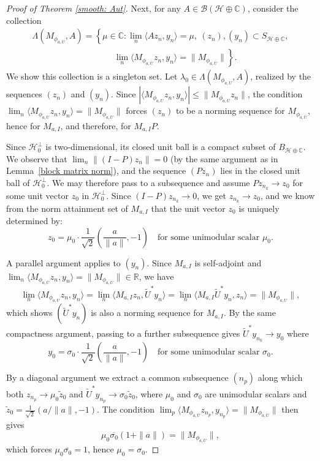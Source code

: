 \documentclass[12pt]{amsart}
\theoremstyle{definition}
\renewcommand{\H}{\mathcal{H}}
\begin{document}
\begin{proof}[Proof of Theorem \ref{smooth: Aut}]
\medskip

Next, for any $A \in \mathcal{B}(\mathcal{H} \oplus \mathbb{C})$, consider the 
collection 
\begin{multline*}
\Lambda(M_{\phi_{a,U}}, A) = \left\{\mu \in \mathbb{C} : 
\lim_n \langle Az_n, y_n\rangle = \mu,\ 
(z_n),(y_n) \subset S_{\mathcal{H}\oplus\mathbb{C}},\right.\\
\left.\hspace{4cm} \lim_n \langle M_{\phi_{a,U}}z_n, y_n\rangle 
= \|M_{\phi_{a,U}}\|\right\}.
\end{multline*}
We show this collection is a singleton set. Let $\lambda_0 \in 
\Lambda(M_{\phi_{a,U}}, A)$, realized by the sequences $(z_n)$ and $(y_n)$. 
Since $|\langle M_{\phi_{a,U}}z_n, y_n\rangle| \leq \|M_{\phi_{a,U}}z_n\|$, the 
condition $\lim_n\langle M_{\phi_{a,U}}z_n, y_n\rangle = \|M_{\phi_{a,U}}\|$ 
forces $(z_n)$ to be a norming sequence for $M_{\phi_{a,U}}$, hence for 
$M_{a,I}$, and therefore, for $M_{a,I}P$.

\medskip

\noindent Since $\mathcal{H}_0^\perp$ is 
two-dimensional, its closed unit ball is a compact subset of $B_{\H\oplus \mathbb{C}}$. We observe that 
$\lim_n\|(I-P)z_n\| = 0$ (by the same argument as in 
Lemma~\ref{block matrix norm}), and the sequence $(Pz_n)$ lies in the closed unit ball of $\mathcal{H}_0^\perp$. We may therefore pass to a 
subsequence and assume $Pz_{n_k} \to z_0$ for some unit vector $z_0$ in $\mathcal{H}_0^\perp$. Since $(I-P)z_{n_k} \to 0$, we get 
$z_{n_k} \to z_0$, and we know from the norm attainment set of $M_{a,I}$ that the unit vector $z_0$ is uniquely determined by:
\[
z_0 = \mu_0\cdot\frac{1}{\sqrt{2}}\left(\frac{a}{\|a\|}, -1\right)
\quad\text{for some unimodular scalar } \mu_0.
\]

\noindent A parallel argument applies to $(y_n)$. Since $M_{a,I}$ 
is self-adjoint and $\lim_n\langle M_{\phi_{a,U}}z_n, y_n\rangle = 
\|M_{\phi_{a,U}}\| \in \mathbb{R}$, we have
\[
\lim_n\langle M_{\phi_{a,U}}z_n, y_n\rangle 
= \lim_n\langle M_{a,I}z_n, \widetilde{U}^*y_n\rangle 
= \lim_n\langle M_{a,I}\widetilde{U}^*y_n, z_n\rangle 
= \|M_{\phi_{a,U}}\|,
\]
which shows $(\widetilde{U}^*y_n)$ is also a norming sequence for 
$M_{a,I}$. By the same compactness argument, passing to a further 
subsequence gives $\widetilde{U}^*y_{n_k} \to y_0$ where
\[
y_0 = \sigma_0\cdot\frac{1}{\sqrt{2}}\left(\frac{a}{\|a\|}, -1\right)
\quad\text{for some unimodular scalar } \sigma_0.
\]

\noindent By a diagonal argument we extract a common subsequence 
$(n_p)$ along which both $z_{n_p} \to \mu_0\tilde{z}_0$ and 
$\widetilde{U}^*y_{n_p} \to \sigma_0\tilde{z}_0$, where $\mu_0$ and $\sigma_0$ are unimodular scalars and $\tilde{z}_0 = \frac{1}{\sqrt{2}}\left(a/\|a\|, -1\right)$. 
The condition $\lim_p\langle M_{\phi_{a,U}}z_{n_p}, y_{n_p}\rangle = 
\|M_{\phi_{a,U}}\|$ then gives
\[
\mu_0\overline{\sigma_0}(1 + \|a\|) = \|M_{\phi_{a,U}}\|,
\]
which forces $\mu_0\overline{\sigma_0} = 1$, hence $\mu_0 = \sigma_0$.


\end{proof}
\end{document}
